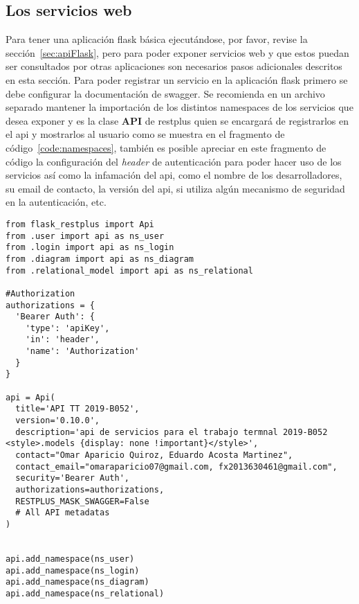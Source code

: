 \subsection{Los servicios web}

 Para tener una aplicación flask básica ejecutándose, por favor, revise la sección~\ref{sec:apiFlask}, pero para poder exponer servicios web y que estos puedan ser consultados por otras aplicaciones son necesarios pasos adicionales descritos en esta sección. Para poder registrar un servicio en la aplicación flask primero se debe configurar la documentación de swagger. Se recomienda en un archivo separado mantener la importación de los distintos namespaces de los servicios que desea exponer y es la clase \textbf{API} de restplus quien se encargará de registrarlos en el api y mostrarlos al usuario como se muestra en el fragmento de código~\ref{code:namespaces}, también es posible apreciar en este fragmento de código la configuración del \textit{header} de autenticación para poder hacer uso de los servicios así como la infamación del api, como el nombre de los desarrolladores, su email de contacto, la versión del api, si utiliza algún mecanismo de seguridad en la autenticación, etc.

\begin{code}
\label{code:namespaces}
\begin{verbatim}
from flask_restplus import Api
from .user import api as ns_user
from .login import api as ns_login
from .diagram import api as ns_diagram
from .relational_model import api as ns_relational

#Authorization
authorizations = {
  'Bearer Auth': {
    'type': 'apiKey',
    'in': 'header',
    'name': 'Authorization'
  }
}

api = Api(
  title='API TT 2019-B052',
  version='0.10.0',
  description='api de servicios para el trabajo termnal 2019-B052 <style>.models {display: none !important}</style>',
  contact="Omar Aparicio Quiroz, Eduardo Acosta Martinez",
  contact_email="omaraparicio07@gmail.com, fx2013630461@gmail.com",
  security='Bearer Auth',
  authorizations=authorizations,
  RESTPLUS_MASK_SWAGGER=False
  # All API metadatas
)


api.add_namespace(ns_user)
api.add_namespace(ns_login)
api.add_namespace(ns_diagram)
api.add_namespace(ns_relational)
\end{verbatim}
\end{code}

